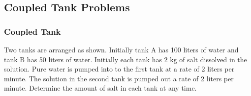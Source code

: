 \subsection{Coupled Tank Problems}


\begin{frame}
  \frametitle{Coupled Tank}


  Two tanks are arranged as shown. Initially tank A has 100 liters of
  water and tank B has 50 liters of water. Initially each tank has 2
  kg of salt dissolved in the solution. Pure water is pumped into to
  the first tank at a rate of 2 liters per minute. The solution in the
  second tank is pumped out a rate of 2 liters per minute. Determine
  the amount of salt in each tank at any time.
  
\end{frame}


